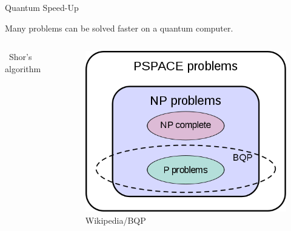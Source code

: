 \begin{frame}{Quantum Speed-Up}
 
  Many problems can be solved faster on a quantum computer.
 
 \begin{columns}
   \Eg~Shor's algorithm
  
    \begin{figure}
     \centering
     \includegraphics[width=\linewidth]{gfx/BQP_complexity_class_diagram}
     \caption{\footnotesize Wikipedia/BQP}
    \end{figure}
 \end{columns}
 
\end{frame}

% 
% 
%  
